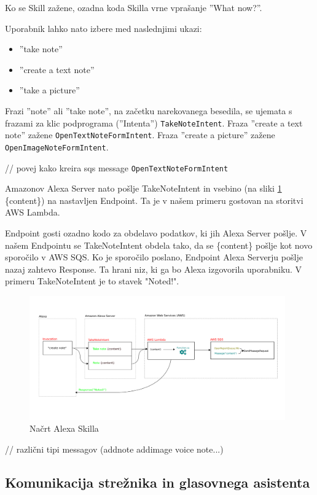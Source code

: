 \documentclass[a4paper, 12pt]{book}
\begin{document}
Ko se Skill zažene, ozadna koda Skilla vrne vprašanje ''What now?''.

Uporabnik lahko nato izbere med naslednjimi ukazi:
\begin{itemize}
	\item ''take note''
	\item ''create a text note''
	\item ''take a picture''
\end{itemize}

Frazi ''note'' ali ''take note'', na začetku narekovanega besedila, se ujemata s frazami za klic podprograma (''Intenta'') \texttt{TakeNoteIntent}.
Fraza ''create a text note'' zažene \texttt{OpenTextNoteFormIntent}.
Fraza ''create a picture'' zažene \texttt{OpenImageNoteFormIntent}.

// povej kako kreira sqs message
\texttt{OpenTextNoteFormIntent} 


Amazonov Alexa Server nato pošlje TakeNoteIntent in vsebino (na sliki \ref{skill} \{content\}) na nastavljen Endpoint.
Ta je v našem primeru gostovan na storitvi AWS Lambda.

Endpoint gosti ozadno kodo za obdelavo podatkov, ki jih Alexa Server pošlje.
V našem Endpointu se TakeNoteIntent obdela tako, da se \{content\} pošlje kot novo sporočilo v AWS SQS.
Ko je sporočilo poslano, Endpoint Alexa Serverju pošlje nazaj zahtevo Response.
Ta hrani niz, ki ga bo Alexa izgovorila uporabniku.
V primeru TakeNoteIntent je to stavek "Noted!".

\begin{figure}[H]
\begin{center}
\includegraphics[width=11cm]{skill}
\end{center}
\caption{Načrt Alexa Skilla}
\label{skill}
\end{figure}

// različni tipi messagov (addnote addimage voice note...)
\subsection{Komunikacija strežnika in glasovnega asistenta}
\end{document}
